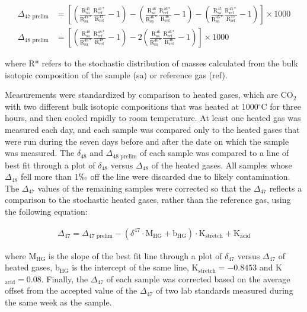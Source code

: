 \documentclass{article}
\newcommand{\degrees}{$^{\circ}$}
\begin{document}
\begin{align}
\Delta_{47\text{ prelim}}&=\left[\left(\frac{\text{R}^{47}_{\text{sa}}}{\text{R}^{47*}_{\text{sa}}}\frac{\text{R}^{47*}_{\text{ref}}}{\text{R}^{47}_{\text{ref}}}-1\right)-\left(\frac{\text{R}^{46}_{\text{sa}}}{\text{R}^{46*}_{\text{sa}}}\frac{\text{R}^{46*}_{\text{ref}}}{\text{R}^{46}_{\text{ref}}}-1\right)-\left(\frac{\text{R}^{45}_{\text{sa}}}{\text{R}^{45*}_{\text{sa}}}\frac{\text{R}^{45*}_{\text{ref}}}{\text{R}^{45}_{\text{ref}}}-1\right)\right]\times 1000\\
\Delta_{48\text{ prelim}}&=\left[\left(\frac{\text{R}^{48}_{\text{sa}}}{\text{R}^{48*}_{\text{sa}}}\frac{\text{R}^{48*}_{\text{ref}}}{\text{R}^{48}_{\text{ref}}}-1\right)-2\left(\frac{\text{R}^{46}_{\text{sa}}}{\text{R}^{46*}_{\text{sa}}}\frac{\text{R}^{46*}_{\text{ref}}}{\text{R}^{46}_{\text{ref}}}-1\right)\right]\times 1000
\end{align}

\noindent where R* refers to the stochastic distribution of masses calculated from the bulk isotopic composition of the sample (sa) or reference gas (ref). 

Measurements were standardized by comparison to heated gases, which are CO$_2$ with two different bulk isotopic compositions that was heated at 1000\degrees C for three hours, and then cooled rapidly to room temperature. At least one heated gas was measured each day, and each sample was compared only to the heated gases that were run during the seven days before and after the date on which the sample was measured. The $\delta_{48}$ and $\Delta_{48\text{ prelim}}$ of each sample was compared to a line of best fit through a plot of $\delta_{48}$ versus $\Delta_{48}$ of the heated gases. All samples whose $\Delta_{48}$ fell more than 1$\permil$ off the line were discarded due to likely contamination. The $\Delta_{47}$ values of the remaining samples were corrected so that the $\Delta_{47}$ reflects a comparison to the stochastic heated gases, rather than the reference gas, using the following equation:

\begin{align}
\Delta_{47}=\Delta_{47\text{ prelim}}-\left(\delta^{47}\cdot\text{M}_{\text{HG}}+\text{b}_{\text{HG}}\right)\cdot\text{K}_{\text{stretch}}+\text{K}_{\text{acid}}
\end{align}

\noindent where M$_{\text{HG}}$ is the slope of the best fit line through a plot of $\delta_{47}$ versus $\Delta_{47}$ of heated gases, b$_{\text{HG}}$ is the intercept of the same line, K$_{\text{stretch}}=-0.8453$ and K$_{\text{acid}}=0.08$. Finally, the $\Delta_{47}$ of each sample was corrected based on the average offset from the accepted value of the $\Delta_{47}$ of two lab standards measured during the same week as the sample. 
\end{document}
